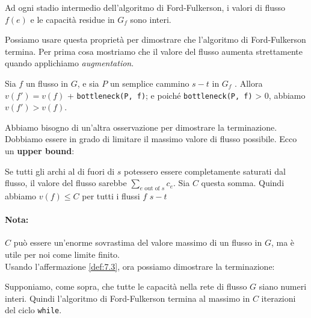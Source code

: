 \begin{myblockquote}
  Ad ogni stadio intermedio dell'algoritmo di Ford-Fulkerson, i valori di
  flusso $f(e)$ e le capacità residue in $G_f$ sono interi.
\end{myblockquote}

Possiamo usare questa proprietà per dimostrare che l'algoritmo di
Ford-Fulkerson termina. Per prima cosa mostriamo che il valore del
flusso aumenta strettamente quando applichiamo \emph{augmentation}.\\

\begin{minipage}{\textwidth}
  \begin{myblockquote}
    \begin{definition}\label{def:7.3}
      Sia $f$ un flusso in $G$, e sia $P$ un semplice cammino $s-t$ in
      $G_f$ . Allora $v(f') = v(f)$ + \texttt{bottleneck(P,\ f)}; e poiché
      \texttt{bottleneck(P,\ f)} \textgreater{} 0, abbiamo $v(f') > v(f)$.
    \end{definition}
  \end{myblockquote}
\end{minipage}

Abbiamo bisogno di un'altra osservazione per dimostrare la terminazione.
Dobbiamo essere in grado di limitare il massimo valore di flusso
possibile. Ecco un \textbf{upper bound}:

\begin{myblockquote}
  Se tutti gli archi al di
  fuori di $s$ potessero essere completamente saturati dal flusso, il
  valore del flusso sarebbe $\sum_{e \text{ out of }s} c_e$. Sia $C$
  questa somma. Quindi abbiamo $v(f) \le C$ per tutti i flussi $f$
  $s-t$
\end{myblockquote}

\paragraph*{Nota:} $C$ può essere un'enorme sovrastima del valore massimo
di un flusso in $G$, ma è utile per noi come limite finito.\\

Usando l'affermazione \ref{def:7.3}, ora possiamo dimostrare la terminazione:

\begin{myblockquote}
  Supponiamo, come sopra, che tutte le capacità nella rete
  di flusso $G$ siano numeri interi. Quindi l'algoritmo di
  Ford-Fulkerson termina al massimo in $C$ iterazioni del ciclo
  \texttt{while}.
\end{myblockquote}


